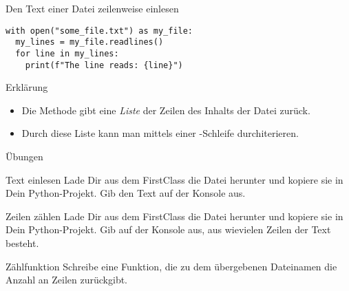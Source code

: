 \begin{fragile}
\begin{block}{Den Text einer Datei zeilenweise einlesen}
\pause 
\vspace{2pt}

\begin{verbatim}
with open("some_file.txt") as my_file:
  my_lines = my_file.readlines()
  for line in my_lines:
    print(f"The line reads: {line}")
\end{verbatim}

\pause
\vspace{12pt}

\begin{exampleblock}{Erklärung}
\vspace{2pt}
\begin{itemize}[<+->]
\item Die Methode  gibt eine \emph{Liste} der Zeilen des Inhalts der Datei  zurück. 
\item Durch diese Liste kann man mittels einer -Schleife durchiterieren. 
\end{itemize}
\end{exampleblock}
\end{block}
\end{fragile}

\begin{frame}{Übungen}
\begin{block}{Text einlesen}
\vspace{2pt}
Lade Dir aus dem FirstClass die Datei  herunter und kopiere sie in Dein Python-Projekt. Gib den Text auf der Konsole aus. 
\end{block}

\pause 
\vspace{12pt}

\begin{block}{Zeilen zählen}
\vspace{2pt}
Lade Dir aus dem FirstClass die Datei  herunter und kopiere sie in Dein Python-Projekt. Gib auf der Konsole aus, aus wievielen Zeilen der Text besteht.  
\end{block}

\pause 
\vspace{12pt}

\begin{block}{Zählfunktion}
\vspace{2pt}
Schreibe eine Funktion, die zu dem übergebenen Dateinamen die Anzahl an Zeilen zurückgibt. 
\end{block}
\end{frame}


